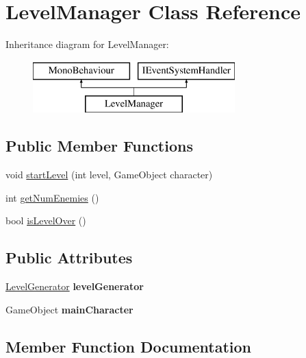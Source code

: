 \hypertarget{class_level_manager}{}\section{Level\+Manager Class Reference}
\label{class_level_manager}
Inheritance diagram for Level\+Manager\+:\begin{figure}[H]
\begin{center}
\leavevmode
\includegraphics[height=2.000000cm]{class_level_manager}
\end{center}
\end{figure}
\subsection*{Public Member Functions}
\begin{DoxyCompactItemize}
\item 
void \mbox{\hyperlink{class_level_manager_a3f1b65f6b95299d86c615c9722f5da10}{start\+Level}} (int level, Game\+Object character)
\item 
int \mbox{\hyperlink{class_level_manager_a2b4501007dcaaa1df85ff558887f59f8}{get\+Num\+Enemies}} ()
\item 
bool \mbox{\hyperlink{class_level_manager_a28ffd8fcec835f1c04c8013c1173834a}{is\+Level\+Over}} ()
\end{DoxyCompactItemize}
\subsection*{Public Attributes}
\begin{DoxyCompactItemize}
\item 
\mbox{\label{class_level_manager_a2d9c37e6a44b5deccece48f80aaec88e}} 
\mbox{\hyperlink{class_completed_1_1_level_generator}{Level\+Generator}} {\bfseries level\+Generator}
\item 
\mbox{\label{class_level_manager_a376391b9d38d7ed131a528ce7d216855}} 
Game\+Object {\bfseries main\+Character}
\end{DoxyCompactItemize}


\subsection{Member Function Documentation}
\mbox{\label{class_level_manager_a2b4501007dcaaa1df85ff558887f59f8}} 

